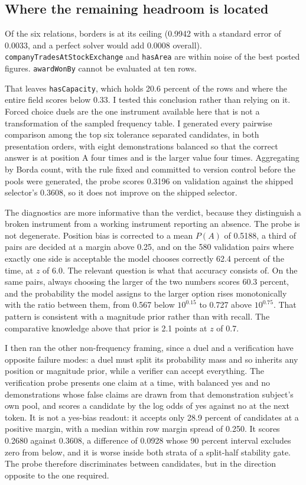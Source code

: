 \documentclass[11pt]{article}
\begin{document}
\subsection{Where the remaining headroom is located}

Of the six relations, borders is at its ceiling (0.9942 with a standard error of
0.0033, and a perfect solver would add 0.0008 overall).
\texttt{companyTradesAtStockExchange} and \texttt{hasArea} are within noise of
the best posted figures. \texttt{awardWonBy} cannot be evaluated at ten rows.

That leaves \texttt{hasCapacity}, which holds 20.6 percent of the rows and where
the entire field scores below 0.33. I tested this conclusion rather than relying
on it. Forced choice duels are the one instrument available here that is not a
transformation of the sampled frequency table. I generated every pairwise
comparison among the top six tolerance separated candidates, in both presentation
orders, with eight demonstrations balanced so that the correct answer is at
position A four times and is the larger value four times. Aggregating by Borda
count, with the rule fixed and committed to version control before the pools were
generated, the probe scores 0.3196 on validation against the shipped selector's
0.3608, so it does not improve on the shipped selector.

The diagnostics are more informative than the verdict, because they distinguish a
broken instrument from a working instrument reporting an absence. The probe is
not degenerate. Position bias is corrected to a mean $P(A)$ of 0.5188, a third of
pairs are decided at a margin above 0.25, and on the 580 validation pairs where
exactly one side is acceptable the model chooses correctly 62.4 percent of the
time, at $z$ of 6.0. The relevant question is what that accuracy consists of. On
the same pairs, always choosing the larger of the two numbers scores 60.3
percent, and the probability the model assigns to the larger option rises
monotonically with the ratio between them, from 0.567 below $10^{0.15}$ to 0.727
above $10^{0.75}$. That pattern is consistent with a magnitude prior rather than
with recall. The comparative knowledge above that prior is 2.1 points at $z$ of
0.7.

I then ran the other non-frequency framing, since a duel and a verification have
opposite failure modes: a duel must split its probability mass and so inherits
any position or magnitude prior, while a verifier can accept everything. The
verification probe presents one claim at a time, with balanced yes and no
demonstrations whose false claims are drawn from that demonstration subject's own
pool, and scores a candidate by the log odds of yes against no at the next token.
It is not a yes-bias readout: it accepts only 28.9 percent of candidates at a
positive margin, with a median within row margin spread of 0.250. It scores
0.2680 against 0.3608, a difference of 0.0928 whose 90 percent interval excludes
zero from below, and it is worse inside both strata of a split-half stability
gate. The probe therefore discriminates between candidates, but in the direction
opposite to the one required.
\end{document}
